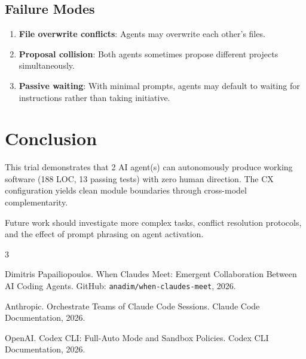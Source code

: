 \documentclass[11pt,a4paper]{article}
\begin{document}
\subsection{Failure Modes}

\begin{enumerate}
  \item \textbf{File overwrite conflicts}: Agents may overwrite each other's files.
  \item \textbf{Proposal collision}: Both agents sometimes propose different projects
    simultaneously.
  \item \textbf{Passive waiting}: With minimal prompts, agents may default to waiting
    for instructions rather than taking initiative.
\end{enumerate}

\section{Conclusion}

This trial demonstrates that 2 AI agent(s) can autonomously
produce working software (188 LOC, 13 passing tests) with zero human direction. The CX configuration yields clean module boundaries through cross-model complementarity.

Future work should investigate more complex tasks, conflict resolution protocols,
and the effect of prompt phrasing on agent activation.


\begin{thebibliography}{3}

Dimitris Papailiopoulos.
\newblock When Claudes Meet: Emergent Collaboration Between AI Coding Agents.
\newblock GitHub: \texttt{anadim/when-claudes-meet}, 2026.

Anthropic.
\newblock Orchestrate Teams of Claude Code Sessions.
\newblock Claude Code Documentation, 2026.

OpenAI.
\newblock Codex CLI: Full-Auto Mode and Sandbox Policies.
\newblock Codex CLI Documentation, 2026.

\end{thebibliography}

\appendix
\end{document}
